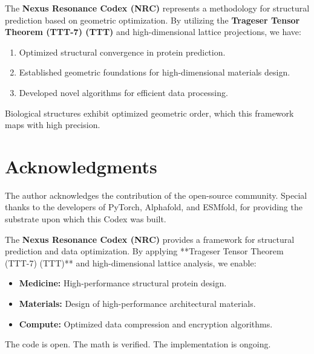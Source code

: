 \documentclass[11pt,a4paper,oneside]{article}
\begin{document}
	The \textbf{Nexus Resonance Codex (NRC)} represents a methodology for structural prediction based on geometric optimization.
	By utilizing the \textbf{Trageser Tensor Theorem (TTT-7) (TTT)} and high-dimensional lattice projections, we have:
	\begin{enumerate}
		\item Optimized structural convergence in protein prediction.
		\item Established geometric foundations for high-dimensional materials design.
		\item Developed novel algorithms for efficient data processing.
	\end{enumerate}

	Biological structures exhibit optimized geometric order, which this framework maps with high precision.

	\section*{Acknowledgments}
	The author acknowledges the contribution of the open-source community. Special thanks to the developers of PyTorch, Alphafold, and ESMfold, for providing the substrate upon which this Codex was built.

	The \textbf{Nexus Resonance Codex (NRC)} provides a framework for structural prediction and data optimization. By applying **Trageser Tensor Theorem (TTT-7) (TTT)** and high-dimensional lattice analysis, we enable:
	\begin{itemize}
		\item \textbf{Medicine:} High-performance structural protein design.
		\item \textbf{Materials:} Design of high-performance architectural materials.
		\item \textbf{Compute:} Optimized data compression and encryption algorithms.
	\end{itemize}

	The code is open. The math is verified. The implementation is ongoing.
\end{document}
